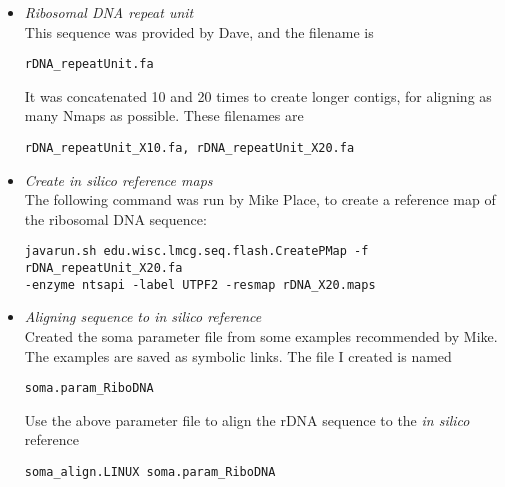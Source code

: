 \documentclass[11pt]{article}
\begin{document}
\begin{enumerate}
\begin{itemize}
\item \emph{Ribosomal DNA repeat unit} \\
This sequence was provided by Dave, and the filename is 
\begin{verbatim}
rDNA_repeatUnit.fa
\end{verbatim}
It was concatenated 10 and 20 times to create longer contigs, for aligning as many Nmaps as possible. These filenames are 
\begin{verbatim}
rDNA_repeatUnit_X10.fa, rDNA_repeatUnit_X20.fa
\end{verbatim}

\item \emph{Create in silico reference maps} \\
The following command was run by Mike Place, to create a reference map of the ribosomal DNA sequence:
\begin{verbatim}
javarun.sh edu.wisc.lmcg.seq.flash.CreatePMap -f rDNA_repeatUnit_X20.fa 
-enzyme ntsapi -label UTPF2 -resmap rDNA_X20.maps
\end{verbatim}

\item \emph{Aligning sequence to in silico reference} \\
Created the soma parameter file from some examples recommended by Mike. The examples are saved as symbolic links. The file I created is named 
\begin{verbatim}
soma.param_RiboDNA
\end{verbatim}
Use the above parameter file to align the rDNA sequence to the {\emph{in silico}} reference
\begin{verbatim}
soma_align.LINUX soma.param_RiboDNA
\end{verbatim}

\end{itemize}
\end{enumerate}
\end{document}
